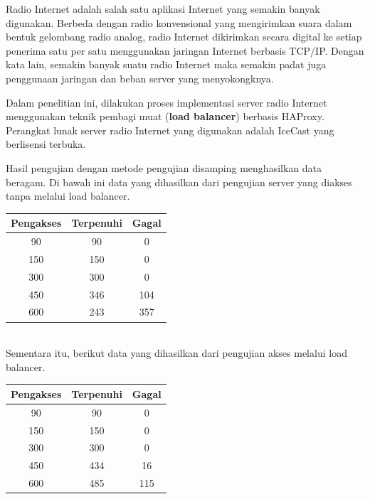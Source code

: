 \documentclass[a0,portrait]{a0poster}
\begin{document}
\begin{multicols}{2}
\LARGE
\begin{tcolorbox}[colback=blue!5!white,colframe=blue!75!black,title=Pendahuluan]
Radio Internet adalah salah satu aplikasi Internet yang semakin banyak digunakan. Berbeda dengan radio konvensional yang mengirimkan suara dalam bentuk gelombang radio analog, radio Internet dikirimkan secara digital ke setiap penerima satu per satu menggunakan jaringan Internet berbasis TCP/IP. Dengan kata lain, semakin banyak suatu radio Internet maka semakin padat juga penggunaan jaringan dan beban server yang menyokongknya.

Dalam penelitian ini, dilakukan proses implementasi server radio Internet menggunakan teknik pembagi muat (\textbf{load balancer}) berbasis HAProxy. Perangkat lunak server radio Internet yang digunakan adalah IceCast yang berlisensi terbuka.
\end{tcolorbox}

\begin{tcolorbox}[colback=blue!5!white,colframe=red!75!black,title=Pengujian]
	Hasil pengujian dengan metode pengujian disamping menghasilkan data beragam. Di bawah ini data yang dihasilkan dari pengujian server yang diakses tanpa melalui load balancer.
	\ \\
	\begin{center}
		\begin{tabular}{|c|c|c|}
			\hline
			\textbf{Pengakses} & \textbf{Terpenuhi} & \textbf{Gagal} \\ \hline
			90 & 90 & 0 \\ \hline
			150 & 150 & 0 \\ \hline
			300 & 300 & 0 \\ \hline
			450 & 346 & 104 \\ \hline
			600 & 243 & 357 \\ \hline
		\end{tabular}
	\end{center}
	\ \\
	Sementara itu, berikut data yang dihasilkan dari pengujian akses melalui load balancer.	
	\ \\
	
	\begin{center}
		\begin{tabular}{|c|c|c|}
			\hline
			\textbf{Pengakses} & \textbf{Terpenuhi} & \textbf{Gagal} \\ \hline
			90 & 90 & 0 \\ \hline
			150 & 150 & 0 \\ \hline
			300 & 300 & 0 \\ \hline
			450 & 434 & 16 \\ \hline
			600 & 485 & 115 \\ \hline
		\end{tabular}
	\end{center}
	

\end{tcolorbox}
\end{multicols}
\end{document}
